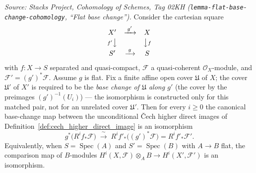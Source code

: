 \begin{lemma}

  \label{lem:cech_flat_base_change}
  \textit{Source: Stacks Project, Cohomology of Schemes, Tag 02KH
  (\texttt{lemma-flat-base-change-cohomology}, ``Flat base change'').}
  Consider the cartesian square
  \[
    \begin{array}{ccc}
      X' & \xrightarrow{\;g'\;} & X \\[2pt]
      {\scriptstyle f'}\big\downarrow & & \big\downarrow{\scriptstyle f} \\[2pt]
      S' & \xrightarrow{\;g\;} & S
    \end{array}
  \]
  with \(f : X \to S\) separated and quasi-compact, \(\mathcal{F}\) a
  quasi-coherent \(\mathcal{O}_X\)-module, and
  \(\mathcal{F}' = (g')^*\mathcal{F}\). Assume \(g\) is flat. Fix a finite affine
  open cover \(\mathfrak{U}\) of \(X\); the cover \(\mathfrak{U}'\) of \(X'\) is
  required to be the \emph{base change of \(\mathfrak{U}\) along \(g'\)} (the cover
  by the preimages \((g')^{-1}(U_i)\)) — the isomorphism is constructed only for
  this matched pair, not for an unrelated cover \(\mathfrak{U}'\). Then for every
  \(i \geq 0\) the canonical base-change map between the unconditional {\v C}ech
  higher direct images of Definition~\ref{def:cech_higher_direct_image} is an
  isomorphism
  \[
    g^*\bigl(R^i f_*\mathcal{F}\bigr) \;\xrightarrow{\;\sim\;}\;
      R^i f'_*\bigl((g')^*\mathcal{F}\bigr) = R^i f'_*\mathcal{F}'.
  \]
  Equivalently, when \(S = \operatorname{Spec}(A)\) and
  \(S' = \operatorname{Spec}(B)\) with \(A \to B\) flat, the comparison map of
  \(B\)-modules \(H^i(X, \mathcal{F}) \otimes_A B \to H^i(X', \mathcal{F}')\) is an
  isomorphism.
\end{lemma}

